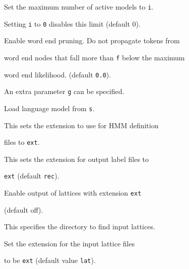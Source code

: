 \begin{optlist}
   Set the maximum number of active models to \texttt{i}.


        Setting \texttt{i} to \texttt{0} disables this limit (default 0).





   Enable word end pruning.  Do not propagate tokens from


        word end nodes that fall more than \texttt{f} below the maximum 


        word end likelihood.  (default \texttt{0.0}). 


        An extra parameter \texttt{g} can be specified.





   Load language model from \texttt{s}.





    This sets the extension to use for HMM definition


      files to \texttt{ext}.





    This sets the extension for output label files to


        \texttt{ext} (default \texttt{rec}).





    Enable output of lattices with extension \texttt{ext}


                   (default off).





   This specifies the directory to find input lattices. 










   Set the extension for the input lattice files 


        to be \texttt{ext}  (default value \texttt{lat}).





\stdoptE


\stdoptF


\stdoptG


\stdoptH


\stdoptJ


\stdoptK


\stdoptP





\end{optlist}


